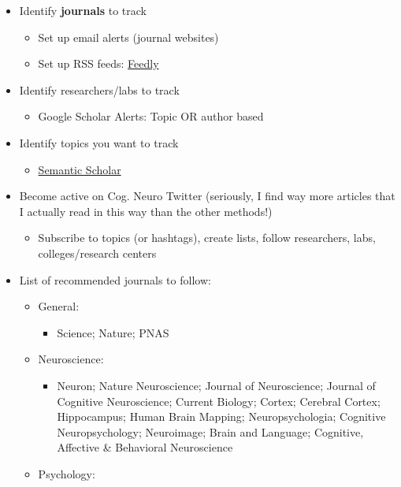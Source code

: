 \documentclass[
  12pt,
]{book}
\providecommand{\tightlist}{%
  \setlength{\itemsep}{0pt}\setlength{\parskip}{0pt}}
\begin{document}
\begin{itemize}
\tightlist
\item
  Identify \textbf{journals} to track

  \begin{itemize}
  \tightlist
  \item
    Set up email alerts (journal websites)
  \item
    Set up RSS feeds: \href{feedly.com}{Feedly}
  \end{itemize}
\item
  Identify researchers/labs to track

  \begin{itemize}
  \tightlist
  \item
    Google Scholar Alerts: Topic OR author based
  \end{itemize}
\item
  Identify topics you want to track

  \begin{itemize}
  \tightlist
  \item
    \href{https://www.semanticscholar.org/}{Semantic Scholar}
  \end{itemize}
\item
  Become active on Cog. Neuro Twitter (seriously, I find way more articles that I actually read in this way than the other methods!)

  \begin{itemize}
  \tightlist
  \item
    Subscribe to topics (or hashtags), create lists, follow researchers, labs, colleges/research centers
  \end{itemize}
\item
  List of recommended journals to follow:

  \begin{itemize}
  \tightlist
  \item
    General:

    \begin{itemize}
    \tightlist
    \item
      Science; Nature; PNAS
    \end{itemize}
  \item
    Neuroscience:

    \begin{itemize}
    \tightlist
    \item
      Neuron; Nature Neuroscience; Journal of Neuroscience; Journal of Cognitive Neuroscience; Current Biology; Cortex; Cerebral Cortex; Hippocampus; Human Brain Mapping; Neuropsychologia; Cognitive Neuropsychology; Neuroimage; Brain and Language; Cognitive, Affective \& Behavioral Neuroscience
    \end{itemize}
  \item
    Psychology:


\end{itemize}
\end{itemize}
\end{document}
